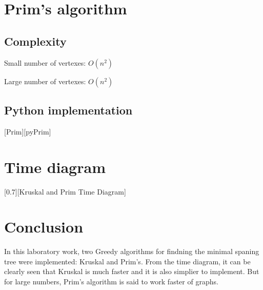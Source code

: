 \documentclass{article}
\begin{document}
	\newpage
	\section{Prim's algorithm}
		\subsection{Complexity}
		\begin{center}
			\par Small number of vertexes: \( O(n^2) \)
			\par Large number of vertexes: \( O(n^2) \)
		\end{center}
		\subsection{Python implementation}
		[pyPrim]

	\newpage
	\section{Time diagram}
		\def \timeDiagram {Kruskal and Prim Time Diagram}
		[0.7][\timeDiagram]

	\newpage
	\section{Conclusion}
		\par In this laboratory work, two Greedy algorithms for findning the minimal spaning tree were implemented: Kruskal and Prim's. From the time diagram, it can be clearly seen that Kruskal is much faster and it is also simplier to implement. But for large numbers, Prim's algorithm is said to work faster of graphs.
\end{document}
